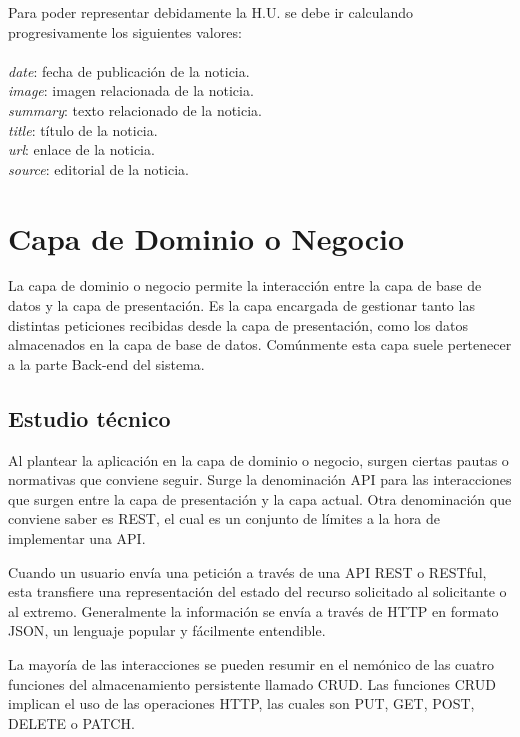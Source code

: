 Para poder representar debidamente la H.U. se debe ir calculando progresivamente los siguientes valores:
\\\\
\textit{date}: fecha de publicación de la noticia.  \\
\textit{image}: imagen relacionada de la noticia.    \\
\textit{summary}: texto relacionado de la noticia.    \\
\textit{title}: título de la noticia.    \\
\textit{url}: enlace de la noticia.    \\
\textit{source}: editorial de la noticia.

\section{Capa de Dominio o Negocio}
La capa de dominio o negocio permite la interacción entre la capa de base de datos y la capa de presentación. Es la capa encargada de gestionar tanto las distintas peticiones recibidas desde la capa de presentación, como los datos almacenados en la capa de base de datos. Comúnmente esta capa suele pertenecer a la parte Back-end del sistema.

\subsection{Estudio técnico}
Al plantear la aplicación en la capa de dominio o negocio, surgen ciertas pautas o normativas que conviene seguir. Surge la denominación \ac{API} para las interacciones que surgen entre la capa de presentación y la capa actual. Otra denominación que conviene saber es \ac{REST}, el cual es un conjunto de límites a la hora de implementar una \ac{API}. \cite{redahat-manual}

\vspace{0.3cm}

Cuando un usuario envía una petición a través de una API REST o RESTful, esta transfiere una representación del estado del recurso solicitado al solicitante o al extremo. Generalmente la información se envía a través de \ac{HTTP} en formato \ac{JSON}, un lenguaje popular y fácilmente entendible. \cite{redahat-manual}

\vspace{0.3cm}

La mayoría de las interacciones se pueden resumir en el nemónico de las cuatro funciones del almacenamiento persistente llamado \ac{CRUD}. Las funciones \ac{CRUD} implican el uso de las operaciones \ac{HTTP}, las cuales son PUT, GET, POST, DELETE o PATCH.

